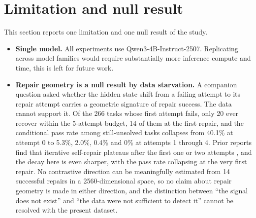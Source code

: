 \section{Limitation and null result}
\label{sec:limitations}

This section reports one limitation and one null result of the study.

\begin{itemize}
    \item \textbf{Single model.} All experiments use Qwen3-4B-Instruct-2507. Replicating across model families would require substantially more inference compute and time, this is left for future work.

    \item \textbf{Repair geometry is a null result by data starvation.} A companion question asked whether the hidden state shift from a failing attempt to its repair attempt carries a geometric signature of repair success. The data cannot support it. Of the 266 tasks whose first attempt fails, only 20 ever recover within the 5-attempt budget, 14 of them at the first repair, and the conditional pass rate among still-unsolved tasks collapses from 40.1\% at attempt 0 to 5.3\%, 2.0\%, 0.4\% and 0\% at attempts 1 through 4. Prior reports find that iterative self-repair plateaus after the first one or two attempts \citep{arimbur2026howmanytries}, and the decay here is even sharper, with the pass rate collapsing at the very first repair. No contrastive direction can be meaningfully estimated from 14 successful repairs in a 2560-dimensional space, so no claim about repair geometry is made in either direction, and the distinction between ``the signal does not exist'' and ``the data were not sufficient to detect it'' cannot be resolved with the present dataset.
\end{itemize}
